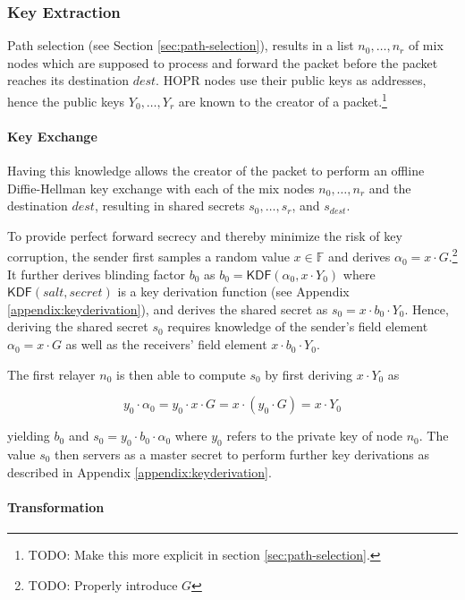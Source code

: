 \subsubsection{Key Extraction}
\label{sec:sphinx:keyderivation}

Path selection (see Section \ref{sec:path-selection}), results in a list $n_0, \dots, n_r$ of mix nodes which are supposed to process and forward the packet before the packet reaches its destination $dest$. HOPR nodes use their public keys as addresses, hence the public keys $Y_0, \dots , Y_r$ are known to the creator of a packet.\footnote{TODO: Make this more explicit in section \ref{sec:path-selection}.}

\paragraph{Key Exchange}

Having this knowledge allows the creator of the packet to perform an offline Diffie-Hellman key exchange with each of the mix nodes $n_0 , \dots , n_r$ and the destination $dest$, resulting in shared secrets $s_0, \dots , s_r$, and $s_{dest}$.

To provide perfect forward secrecy and thereby minimize the risk of key corruption, the sender first samples a random value $x \in \mathbb{F}$ and derives $\alpha_0 = x \cdot G$.\footnote{TODO: Properly introduce $G$} It further derives blinding factor $b_0$ as $b_0 = \mathsf{KDF}(\alpha_0, x \cdot Y_0)$ where $\mathsf{KDF}(salt, secret)$ is a key derivation function (see Appendix \ref{appendix:keyderivation}), and derives the shared secret as $s_0 = x \cdot b_0 \cdot Y_0$. Hence, deriving the shared secret $s_0$ requires knowledge of the sender's field element $\alpha_0 = x \cdot G$ as well as the receivers' field element $x \cdot b_0 \cdot Y_0$.

The first relayer $n_0$ is then able to compute $s_0$ by first deriving $x \cdot Y_0$ as

$$y_0 \cdot \alpha_0 = y_0 \cdot x \cdot G = x \cdot ( y_0 \cdot G) = x \cdot Y_0$$

yielding $b_0$ and $s_0 = y_0 \cdot b_0 \cdot \alpha_0$ where $y_0$ refers to the private key of node $n_0$. The value $s_0$ then servers as a master secret to perform further key derivations as described in Appendix \ref{appendix:keyderivation}.

\paragraph{Transformation}

